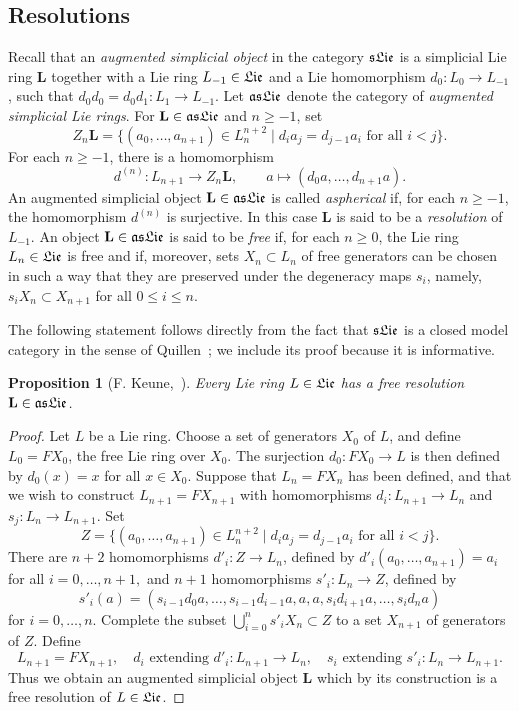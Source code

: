 \documentclass[a4paper,reqno,notitlepage]{amsart}
\newtheorem{prop}[theorem]{Proposition}
\theoremstyle{definition}
\begin{document}
\subsection{Resolutions}
Recall that an \emph{augmented simplicial object} in the category
$\mathfrak{sLie}$ is a simplicial Lie ring $\mathbf L$ together with a Lie ring
$L_{-1}\in \mathfrak{Lie}$ and a Lie homomorphism $d_0:L_0\to L_{-1}$, such that
$d_0d_0=d_0d_1:L_1\to L_{-1}$.  Let $\mathfrak{asLie}$ denote the category of
\emph{augmented simplicial Lie rings}.  For $\mathbf L\in\mathfrak{asLie}$ and
$n\geq -1$, set
\[Z_n\mathbf L=\{(a_0,\ldots,a_{n+1})\in
L_n^{n+2}\mid d_ia_j=d_{j-1}a_i\text{ for all }i<j\}.
\]
For each $n\geq-1$, there is a homomorphism
\[d^{(n)}:L_{n+1}\to Z_n\mathbf L,\qquad a\mapsto (d_0a,\ldots,d_{n+1}a).
\]
An augmented simplicial object $\mathbf L\in \mathfrak{asLie}$ is called
\emph{aspherical} if, for each $n\geq -1$, the homomorphism $d^{(n)}$
is surjective. In this case $\mathbf L$ is said to be a
\emph{resolution} of $L_{-1}$.  An object $\mathbf L\in \mathfrak{asLie}$ is
said to be \emph{free} if, for each $n\geq 0$, the Lie ring $L_n\in
\mathfrak{Lie}$ is free and if, moreover, sets $X_n\subset L_n$ of free
generators can be chosen in such a way that they are preserved under
the degeneracy maps $s_i$, namely, $s_iX_n\subset X_{n+1}$ for all
$0\leq i\leq n$.

The following statement follows directly from the fact that $\mathfrak{sLie}$ is
a closed model category in the sense of Quillen~\cite{Quillen:67}; we
include its proof because it is informative.
\begin{prop}[F. Keune,~\cite{Keune:73}]\label{prop:free resolution}
  Every Lie ring $L\in \mathfrak{Lie}$ has a free resolution $\mathbf L\in \mathfrak{asLie}$.
\end{prop}
\begin{proof}
  Let $L$ be a Lie ring. Choose a set of generators $X_0$ of $L$, and
  define $L_0=FX_0$, the free Lie ring over $X_0$. The surjection
  $d_0:FX_0\to L$ is then defined by $d_0(x)=x$ for all $x\in
  X_0$. Suppose that $L_n=FX_n$ has been defined, and that we wish to
  construct $L_{n+1}=FX_{n+1}$ with homomorphisms $d_i:L_{n+1}\to L_n$
  and $s_j:L_n\to L_{n+1}$.  Set
  \[Z=\{(a_0,\ldots,a_{n+1})\in L_n^{n+2}\mid d_ia_j=d_{j-1}a_i\text{ for all } i<j\}.
  \]
  There are $n+2$ homomorphisms $d'_i:Z\to L_n$, defined by
  $d'_i(a_0,\ldots,a_{n+1})=a_i$ for all $i=0,\ldots,n+1,$ and $n+1$
  homomorphisms $s'_i:L_n\to Z$, defined
  by
  \[s'_i(a)=(s_{i-1}d_0a,\ldots,s_{i-1}d_{i-1}a,a,a,s_id_{i+1}a,\ldots,s_id_na)\]
  for $i=0,\ldots,n$. Complete the subset
  $\bigcup_{i=0}^ns'_iX_n\subset Z$ to a set $X_{n+1}$ of generators
  of $Z$. Define
  \[L_{n+1}=FX_{n+1},\quad d_i\text{ extending }d'_i:L_{n+1}\to L_n,\quad s_i\text{ extending }s'_i:L_n\to L_{n+1}.
  \]
  Thus we obtain an augmented simplicial object $\mathbf L$ which by
  its construction is a free resolution of $L\in \mathfrak{Lie}$.
\end{proof}
\end{document}
